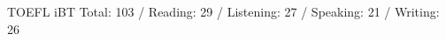 



\begin{cvskills}

      \cvskill
        {TOEFL iBT} %
        {Total: 103 / Reading: 29 / Listening: 27 / Speaking: 21 / Writing: 26} %
    
    
    
\end{cvskills}